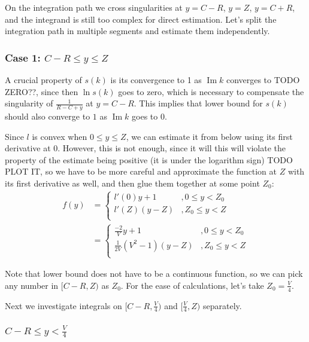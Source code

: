 \documentclass[12pt, a4paper]{article}
\newcommand{\mtodo}[1]{\todo[linecolor=green!70!white, backgroundcolor=blue!20!white, bordercolor=red]{#1}}
\theoremstyle{plain}
\newcommand{\bbR}{\mathbb{R}}
\renewcommand{\Im}{\operatorname{Im}}
\begin{document}
On the integration path we cross singularities at $y = C - R$, $y = Z$, $y = C + R$, and the integrand is still too complex for direct estimation. Let's split the integration path in multiple segments and estimate them independently.

\subsubsection{Case 1: $C - R \le y \le Z$}
A crucial property of $s(k)$ is its convergence to 1 as $\Im k$ converges to TODO ZERO??, since then $\ln s(k)$ goes to zero, which is necessary to compensate the singularity of $\frac{1}{R - C + y}$ at $y = C - R$. 
This implies that lower bound for $s(k)$ should also converge to $1$ as $\Im k$ goes to $0$.

Since $l$ is convex when $0 \le y \le Z$, we can estimate it from below using its first derivative at $0$. However, this is not enough, since it will this will violate the property of the estimate being positive (it is under the logarithm sign) TODO PLOT IT, so we have to be more careful and approximate the function at $Z$ with its first derivative as well, and then glue them together at some point $Z_0$:
\begin{align*}
f(y)
& = 
\begin{cases}
l'(0) y + 1   &, 0 \le y < Z_0  \\
l'(Z) (y - Z) &, Z_0 \le y < Z \\
\end{cases}
\\
& =
\begin{cases}
\frac{-2}{V} y + 1   &, 0 \le y < Z_0  \\
\frac{1}{2 V}(V^2 - 1) (y - Z) &, Z_0 \le y < Z \\
\end{cases}
\end{align*}

Note that lower bound does not have to be a continuous function, so we can pick any number in $[C - R, Z)$ as $Z_0$. For the ease of calculations, let's take $Z_0 = \frac{V}{4}$. \mtodo{plot?}

Next we investigate integrals on $[C - R, \frac{V}{4})$ and $[\frac{V}{4}, Z)$ separately.

\subsubsection{$C - R \le y < \frac{V}{4}$}
\end{document}
